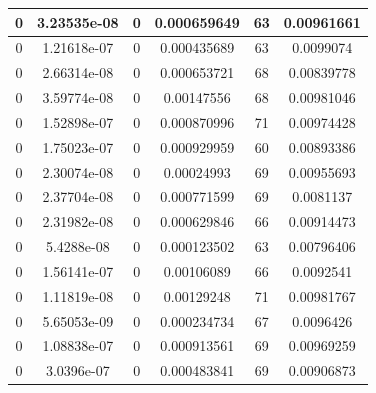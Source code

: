 \documentclass{article}
\begin{document}
\begin{tabular}{cccccc}
0&3.23535e-08&0&0.000659649&63&0.00961661 \\ \hline
0&1.21618e-07&0&0.000435689&63&0.0099074 \\ \hline
0&2.66314e-08&0&0.000653721&68&0.00839778 \\ \hline
0&3.59774e-08&0&0.00147556&68&0.00981046 \\ \hline
0&1.52898e-07&0&0.000870996&71&0.00974428 \\ \hline
0&1.75023e-07&0&0.000929959&60&0.00893386 \\ \hline
0&2.30074e-08&0&0.00024993&69&0.00955693 \\ \hline
0&2.37704e-08&0&0.000771599&69&0.0081137 \\ \hline
0&2.31982e-08&0&0.000629846&66&0.00914473 \\ \hline
0&5.4288e-08&0&0.000123502&63&0.00796406 \\ \hline
0&1.56141e-07&0&0.00106089&66&0.0092541 \\ \hline
0&1.11819e-08&0&0.00129248&71&0.00981767 \\ \hline
0&5.65053e-09&0&0.000234734&67&0.0096426 \\ \hline
0&1.08838e-07&0&0.000913561&69&0.00969259 \\ \hline
0&3.0396e-07&0&0.000483841&69&0.00906873 \\ \hline
\end{tabular}
\end{document}
